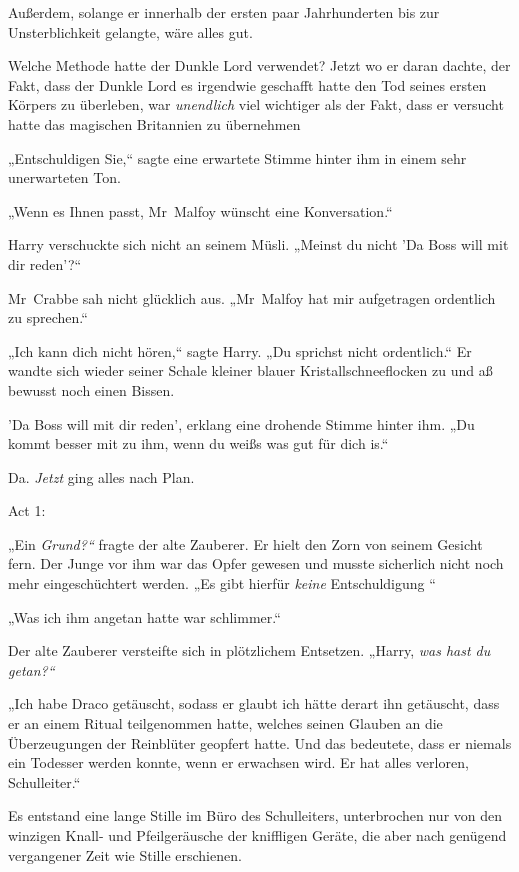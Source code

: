 {Außerdem, solange er innerhalb der ersten paar Jahrhunderten bis zur Unsterblichkeit gelangte, wäre alles gut.

Welche Methode hatte der Dunkle Lord verwendet? Jetzt wo er daran dachte, der Fakt, dass der Dunkle Lord es irgendwie geschafft hatte den Tod seines ersten Körpers zu überleben, war \emph{unendlich} viel wichtiger als der Fakt, dass er versucht hatte das magischen Britannien zu übernehmen \later

„Entschuldigen Sie,“ sagte eine erwartete Stimme hinter ihm in einem sehr unerwarteten Ton.

„Wenn es Ihnen passt, Mr~Malfoy wünscht eine Konversation.“

Harry verschuckte sich nicht an seinem Müsli. „Meinst du nicht 'Da Boss will mit dir reden'?“

Mr~Crabbe sah nicht glücklich aus. „Mr~Malfoy hat mir aufgetragen ordentlich zu sprechen.“

„Ich kann dich nicht hören,“ sagte Harry. „Du sprichst nicht ordentlich.“ Er wandte sich wieder seiner Schale kleiner blauer Kristallschneeflocken zu und aß bewusst noch einen Bissen.

'Da Boss will mit dir reden', erklang eine drohende Stimme hinter ihm. „Du kommt besser mit zu ihm, wenn du weißs was gut für dich is.“

Da. \emph{Jetzt} ging alles nach Plan.

Act 1:

„Ein \emph{Grund?“} fragte der alte Zauberer. Er hielt den Zorn von seinem Gesicht fern. Der Junge vor ihm war das Opfer gewesen und musste sicherlich nicht noch mehr eingeschüchtert werden. „Es gibt hierfür \emph{keine} Entschuldigung \later“

„Was ich ihm angetan hatte war schlimmer.“

Der alte Zauberer versteifte sich in plötzlichem Entsetzen. „Harry, \emph{was hast du getan?“}

„Ich habe Draco getäuscht, sodass er glaubt ich hätte derart ihn getäuscht, dass er an einem Ritual teilgenommen hatte, welches seinen Glauben an die Überzeugungen der Reinblüter geopfert hatte. Und das bedeutete, dass er niemals ein Todesser werden konnte, wenn er erwachsen wird. Er hat alles verloren, Schulleiter.“

Es entstand eine lange Stille im Büro des Schulleiters, unterbrochen nur von den winzigen Knall- und Pfeilgeräusche der kniffligen Geräte, die aber nach genügend vergangener Zeit wie Stille erschienen.

}
